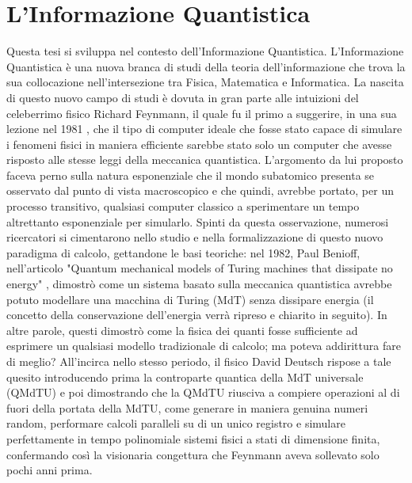 \documentclass[12pt,a4paper,openright]{report}
\begin{document}
\chapter{L'Informazione Quantistica}
Questa tesi si sviluppa nel contesto dell'Informazione Quantistica.
L'Informazione Quantistica è una nuova branca di studi della teoria dell'informazione che trova la sua collocazione nell'intersezione tra
Fisica, Matematica e Informatica. La nascita di questo nuovo campo di studi è dovuta in gran parte alle intuizioni del celeberrimo fisico Richard Feynmann, il quale fu il primo a suggerire,
in una sua lezione nel 1981 \cite{ref6}, che il tipo di computer ideale che fosse stato capace di simulare i fenomeni fisici in maniera
efficiente sarebbe stato solo un computer che avesse risposto alle stesse leggi della meccanica quantistica. L'argomento da lui proposto faceva
perno sulla natura esponenziale che il mondo subatomico presenta se osservato dal punto di vista macroscopico e che quindi, avrebbe portato,
per un processo transitivo, qualsiasi computer classico a sperimentare un tempo altrettanto esponenziale per simularlo.
Spinti da questa osservazione, numerosi ricercatori si cimentarono nello studio e nella formalizzazione di questo nuovo paradigma di calcolo,
gettandone le basi teoriche: nel 1982, Paul Benioff, nell'articolo "Quantum mechanical models of Turing machines that dissipate no energy" \cite{ref7}, 
dimostrò come un sistema basato sulla meccanica quantistica avrebbe potuto modellare una macchina di Turing (MdT) senza dissipare energia (il concetto della conservazione dell'energia 
verrà ripreso e chiarito in seguito). In altre parole, questi dimostrò come la fisica dei quanti fosse sufficiente ad esprimere un qualsiasi modello tradizionale di calcolo; ma poteva addirittura fare di meglio? 
All'incirca nello stesso periodo, il fisico David Deutsch rispose a tale quesito \cite{ref12} introducendo prima la controparte quantica della MdT universale (QMdTU)
e poi dimostrando che la QMdTU riusciva a compiere operazioni al di fuori della portata della MdTU, come generare in maniera genuina numeri random,
performare calcoli paralleli su di un unico registro e simulare perfettamente in tempo polinomiale sistemi fisici a stati di dimensione finita, confermando così
la visionaria congettura che Feynmann aveva sollevato solo pochi anni prima.  
\end{document}
